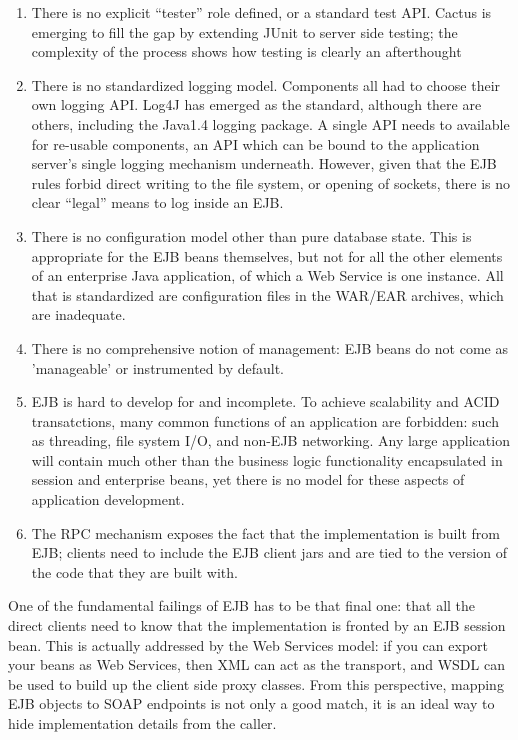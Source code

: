 \documentclass[draft]{report}
\begin{document}
\begin{enumerate}

\item There is no explicit ``tester'' role defined, or a standard test
API. Cactus is emerging to fill the gap by extending JUnit to server
side testing; the complexity of the process shows how testing is clearly
an afterthought

\item There is no standardized logging model. Components all had to
choose their own logging API. Log4J has emerged as the standard,
although there are others, including the Java1.4 logging package. A
single API needs to available for re-usable components, an API which can
be bound to the application server's single logging mechanism
underneath. However, given that the EJB rules forbid direct writing to
the file system, or opening of sockets, there is no clear ``legal''
means to log inside an EJB.  

\item There is no configuration model other than pure database state.
This is appropriate for the EJB beans themselves, but not for all the
other elements of an enterprise Java application, of which a Web Service
is one instance. All that is standardized are configuration files in the
WAR/EAR archives, which are inadequate.

\item There is no comprehensive notion of management: EJB beans do not
come as 'manageable' or instrumented by default.

\item EJB is hard to develop for and incomplete. To achieve scalability
and ACID transatctions, many common functions of an application are
forbidden: such as threading, file system I/O, and non-EJB networking.
Any large application will contain much other than the business logic
functionality encapsulated in session and enterprise beans, yet there is
no model for these aspects of application development.

\item The RPC mechanism exposes the fact that the implementation is
built from EJB; clients need to include the EJB client jars and are tied
to the version of the code that they are built with.

\end{enumerate}

One of the fundamental failings of EJB has to be that final one: that
all the direct clients need to know that the implementation is fronted
by an EJB session bean. This is actually addressed by the Web Services
model: if you can export your beans as Web Services, then XML can act as
the transport, and WSDL can be used to build up the client side proxy
classes. From this perspective, mapping EJB objects to SOAP endpoints is
not only a good match, it is an ideal way to hide implementation details
from the caller.
\end{document}

